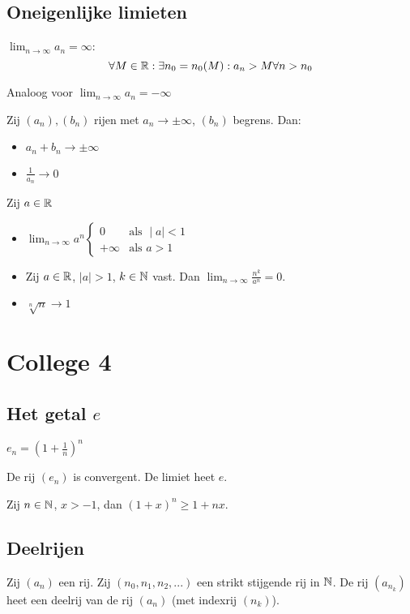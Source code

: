 \documentclass[week=1]{homework}
\begin{document}
	\subsection*{Oneigenlijke limieten}
	\Def $\lim_{n \rightarrow \infty} a_n = \infty$: 
	\[
		\forall M \in \mathbb{R}: \exists n_0 = n_0(M): a_n > M \forall n > n_0
	\]
	
	Analoog voor $\lim_{n \rightarrow \infty} a_n = - \infty$
	
	\Stel[2.3.3, 2.3.6] Zij $(a_n), (b_n)$ rijen met $a_n \rightarrow \pm \infty$, $(b_n)$ begrens. Dan:
	\begin{itemize}
		\item $a_n + b_n \rightarrow \pm \infty$ 
		\item $\frac{1}{a_n} \rightarrow 0$
	\end{itemize}
	
	\Stel[Standaardlimieten] Zij $a \in \mathbb{R}$
	\begin{itemize}
		\item $\lim_{n \rightarrow \infty} a^n \begin{cases}
			0 &\text{als } \mid a \mid < 1\\
			+\infty &\text{als } a > 1
		\end{cases}$
		\item Zij $a \in \mathbb{R}$, $\mid a \mid > 1$, $k \in \mathbb{N}$ vast. Dan $\lim_{n \rightarrow \infty} \frac{n^k}{a^n} = 0$.
		\item $\sqrt[n]{n} \rightarrow 1$
	\end{itemize}
	 
	\newpage
	\section*{College 4}
	\subsection*{Het getal $e$}
		\Def $e_n = (1 + \frac{1}{n})^n$
		
		\Stel De rij $(e_n)$ is convergent. De limiet heet $e$. 
		
		 Zij $n \in \mathbb{N}$, $x > -1$, dan $(1 + x)^n \ge 1 + nx$.	
	
	\subsection*{Deelrijen}
	\Def Zij $(a_n)$ een rij. Zij $(n_0, n_1, n_2, ...)$ een strikt stijgende rij in $\mathbb{N}$. De rij $(a_{n_k})$ heet een deelrij van de rij $(a_n)$ (met indexrij $(n_k)$). 
	
\end{document}
